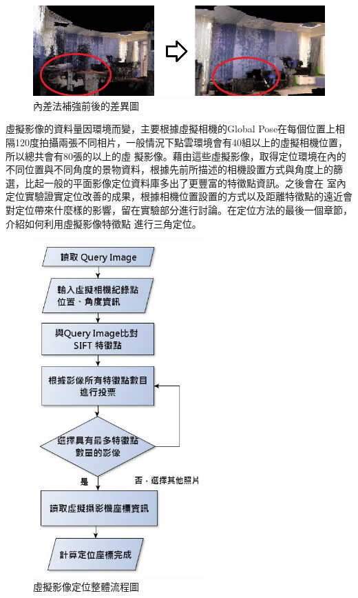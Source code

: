 	\begin{figure}
	\begin{center}
	  \includegraphics[width=1.0\textwidth]{figures/Depth_Interpolation.jpg}
	  \caption{內差法補強前後的差異圖}
	  \label{fig:interpolation}
	\end{center}
	\end{figure}	
	
	虛擬影像的資料量因環境而變，主要根據虛擬相機的Global Pose在每個位置上相隔120度拍攝兩張不同相片，一般情況下點雲環境會有40組以上的虛擬相機位置，所以總共會有80張的以上的虛
	擬影像。藉由這些虛擬影像，取得定位環境在內的不同位置與不同角度的景物資料，根據先前所描述的相機設置方式與角度上的篩選，比起一般的平面影像定位資料庫多出了更豐富的特徵點資訊。之後會在
	室內定位實驗證實定位改善的成果，根據相機位置設置的方式以及距離特徵點的遠近會對定位帶來什麼樣的影響，留在實驗部分進行討論。在定位方法的最後一個章節，介紹如何利用虛擬影像特徵點
	進行三角定位。

\begin{figure}
\begin{center}
  \includegraphics[width=0.6\textwidth]{figures/Localization_Process.jpg}
  \caption{虛擬影像定位整體流程圖}
  \label{fig:Lolcalization Process}  
\end{center}
\end{figure}

